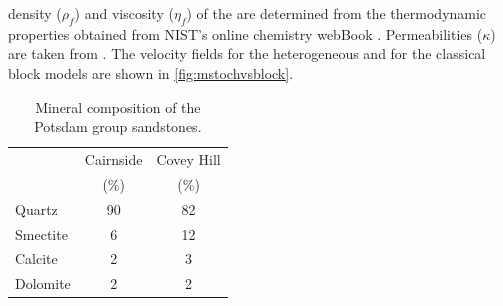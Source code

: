 density ($\rho_f$) and viscosity ($\eta_f$) of the  are determined from
the thermodynamic properties obtained from NIST’s online chemistry webBook
\citep{Lemmon2014}. Permeabilities ($\kappa$) are taken from
\citet{TranNgoc2014}. The velocity fields for the heterogeneous and for the
classical block models are shown in \cref{fig:mstochvsblock}.
\begin{table}[!h]
  \centering
  \caption{Mineral composition of the Potsdam group sandstones.}
\begin{tabular}{lS[table-number-alignment = center,table-format =
2.0]S[table-number-alignment = center,table-format = 2.0]}
\toprule
 & {Cairnside} & {Covey Hill}\\
  & {\small{(\si{\percent})}} & {\small{(\si{\percent})}}\\
\midrule
 Quartz   & 90 & 82 \\
 Smectite  & 6 & 12 \\
 Calcite  & 2 & 3 \\
Dolomite  & 2 & 2 \\
\bottomrule
\end{tabular}
\label{tbl:mineralpost}
\end{table}
